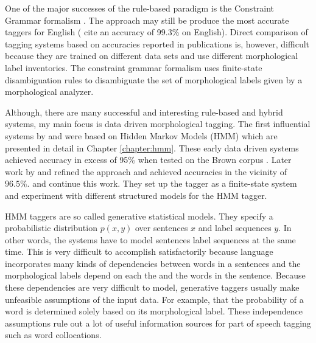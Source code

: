 One of the major successes of the rule-based paradigm is the
Constraint Grammar formalism \citep{Karlsson1995}. The approach may
still be produce the most accurate taggers for English
(\cite{Voutilainen1995} cite an accuracy of 99.3\% on English). Direct
comparison of tagging systems based on accuracies reported in
publications is, however, difficult because they are trained on
different data sets and use different morphological label
inventories. The constraint grammar formalism uses finite-state
disambiguation rules to disambiguate the set of morphological labels
given by a morphological analyzer.

Although, there are many successful and interesting rule-based and
hybrid systems, my main focus is data driven morphological
tagging. The first influential systems by \cite{Church1988} and
\cite{DeRose1988} were based on Hidden Markov Models (HMM) which are
presented in detail in Chapter \ref{chapter:hmm}. These early data
driven systems achieved accuracy in excess of 95\% when tested on the
Brown corpus \citep{Francis1964}. Later work by \cite{Brants2000} and
\cite{Halacsy2007} refined the approach and achieved accuracies in the
vicinity of $96.5\%$. \cite{Silfverberg2010} and
\cite{Silfverberg2011} continue this work. They set up the tagger as a
finite-state system and experiment with different structured models
for the HMM tagger.

HMM taggers are so called generative statistical models. They specify
a probabilistic distribution $p(x,y)$ over sentences $x$ and label
sequences $y$. In other words, the systems have to model sentences
label sequences at the same time. This is very difficult to accomplish
satisfactorily because language incorporates many kinds of
dependencies between words in a sentences and the morphological labels
depend on each the and the words in the sentence. Because these
dependencies are very difficult to model, generative taggers usually
make unfeasible assumptions of the input data. For example, that the
probability of a word is determined solely based on its morphological
label. These independence assumptions rule out a lot of useful
information sources for part of speech tagging such as word
collocations.

